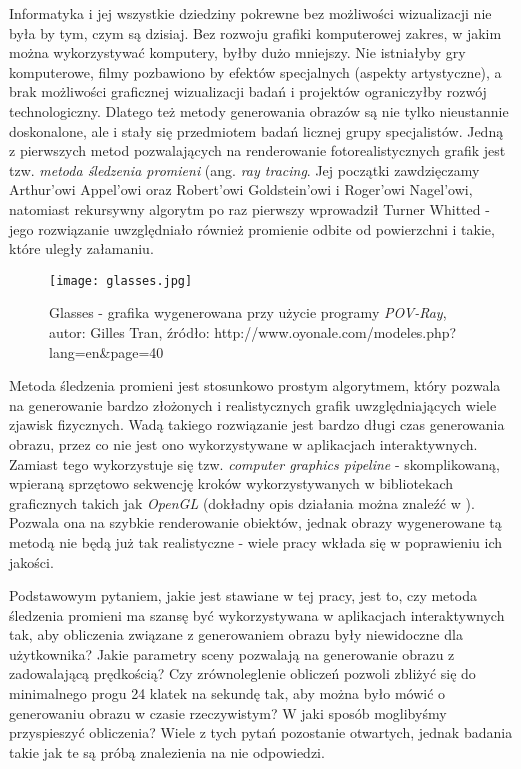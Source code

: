 Informatyka i jej wszystkie dziedziny pokrewne bez możliwości wizualizacji nie była by tym, czym są dzisiaj. Bez rozwoju grafiki komputerowej zakres, w jakim można wykorzystywać komputery, byłby dużo mniejszy. Nie istniałyby gry komputerowe, filmy pozbawiono by efektów specjalnych (aspekty artystyczne), a brak możliwości graficznej wizualizacji badań i projektów ograniczyłby rozwój technologiczny. Dlatego też metody generowania obrazów są nie tylko nieustannie doskonalone, ale i stały się przedmiotem badań licznej grupy specjalistów. Jedną z pierwszych metod pozwalających na renderowanie fotorealistycznych grafik jest tzw. \emph{metoda śledzenia promieni} (ang. \emph{ray tracing}. Jej początki zawdzięczamy Arthur'owi Appel'owi oraz Robert'owi Goldstein'owi i Roger'owi Nagel'owi, natomiast rekursywny algorytm po raz pierwszy wprowadził Turner Whitted - jego rozwiązanie uwzględniało również promienie odbite od powierzchni i takie, które uległy załamaniu.

\begin{figure}[H]
\centering
\texttt{[image: glasses.jpg]}
\caption{Glasses - grafika wygenerowana przy użycie programy \emph{POV-Ray}, autor: Gilles Tran, źródło: http://www.oyonale.com/modeles.php?lang=en\&page=40}
\end{figure}

Metoda śledzenia promieni jest stosunkowo prostym algorytmem, który pozwala na generowanie bardzo złożonych i realistycznych grafik uwzględniających wiele zjawisk fizycznych. Wadą takiego rozwiązanie jest bardzo długi czas generowania obrazu, przez co nie jest ono wykorzystywane w aplikacjach interaktywnych. Zamiast tego wykorzystuje się tzw. \emph{computer graphics pipeline} - skomplikowaną, wpieraną sprzętowo sekwencję kroków wykorzystywanych w bibliotekach graficznych takich jak \emph{OpenGL} (dokładny opis działania można znaleźć w \cite{gpipe}). Pozwala ona na szybkie renderowanie obiektów, jednak obrazy wygenerowane tą metodą nie będą już tak realistyczne - wiele pracy wkłada się w poprawieniu ich jakości.

Podstawowym pytaniem, jakie jest stawiane w tej pracy, jest to, czy metoda śledzenia promieni ma szansę być wykorzystywana w aplikacjach interaktywnych tak, aby obliczenia związane z generowaniem obrazu były niewidoczne dla użytkownika? Jakie parametry sceny pozwalają na generowanie obrazu z zadowalającą prędkością? Czy zrównoleglenie obliczeń pozwoli zbliżyć się do minimalnego progu 24 klatek na sekundę tak, aby można było mówić o generowaniu obrazu w czasie rzeczywistym? W jaki sposób moglibyśmy przyspieszyć obliczenia?  Wiele z tych pytań pozostanie otwartych, jednak badania takie jak te są próbą znalezienia na nie odpowiedzi.


